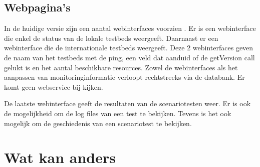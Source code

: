 \subsection{Webpagina\rq s}
\npar
In de huidige versie zijn een aantal webinterfaces voorzien\citep{FED4FIRE-doc} .
Er is een webinterface die enkel de status van de lokale testbeds weergeeft. Daarnaast er een webinterface die de internationale testbeds weergeeft. 
Deze 2 webinterfaces geven de naam van het testbeds met de ping, een veld dat aanduid of de getVersion call gelukt is en het aantal beschikbare resources.
\npar
\clearpage
Zowel de webinterfaces als het aanpassen van monitoringinformatie verloopt rechtstreeks via de databank. Er komt geen webservice bij kijken.

\npar
De laatste webinterface geeft de resultaten van de scenariotesten weer. Er is ook de mogelijkheid om de log files van een test te bekijken. Tevens is het ook mogelijk om de geschiedenis van een scenariotest te bekijken.

\clearpage
\section{Wat kan anders}
